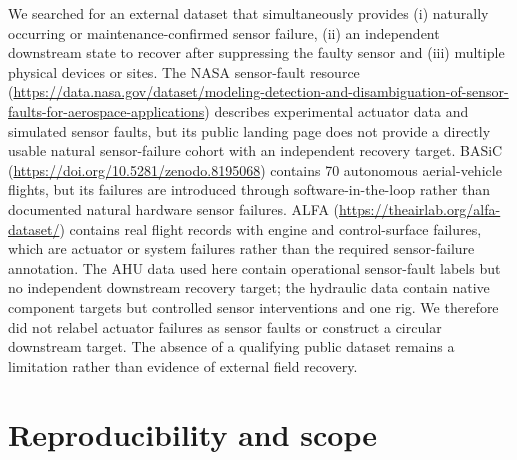 \documentclass[10pt]{article}
\begin{document}
We searched for an external dataset that simultaneously provides (i) naturally occurring or maintenance-confirmed sensor failure, (ii) an independent downstream state to recover after suppressing the faulty sensor and (iii) multiple physical devices or sites. The NASA sensor-fault resource (\url{https://data.nasa.gov/dataset/modeling-detection-and-disambiguation-of-sensor-faults-for-aerospace-applications}) describes experimental actuator data and simulated sensor faults, but its public landing page does not provide a directly usable natural sensor-failure cohort with an independent recovery target. BASiC (\url{https://doi.org/10.5281/zenodo.8195068}) contains 70 autonomous aerial-vehicle flights, but its failures are introduced through software-in-the-loop rather than documented natural hardware sensor failures. ALFA (\url{https://theairlab.org/alfa-dataset/}) contains real flight records with engine and control-surface failures, which are actuator or system failures rather than the required sensor-failure annotation. The AHU data used here contain operational sensor-fault labels but no independent downstream recovery target; the hydraulic data contain native component targets but controlled sensor interventions and one rig. We therefore did not relabel actuator failures as sensor faults or construct a circular downstream target. The absence of a qualifying public dataset remains a limitation rather than evidence of external field recovery.

\section{Reproducibility and scope}
\end{document}
